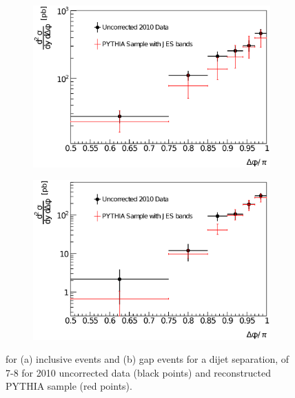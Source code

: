 \begin{figure}
\centering
        \begin{subfigure}[b]{0.5\textwidth}
                \centering
                \includegraphics[width=\textwidth]{figures/GBJ2/ControlPlots/Smeared__dPhi__7_8.eps}
        \end{subfigure}%
        \begin{subfigure}[b]{0.5\textwidth}
                \centering
                \includegraphics[width=\textwidth]{figures/GBJ2/ControlPlots/Smeared__dPhi_gap__7_8.eps}
        \end{subfigure}%
\caption[Comparison of the data and PYTHIA for \dphidyDist{} with $7<\dy{}<8$]{
\dphidyDist{} for (a) inclusive events and (b) gap events for a dijet separation, \dy{} of 7-8 for 2010 uncorrected data (black points) and reconstructed PYTHIA sample (red points).
\label{GBJ2:Uncorr:dphi78}}
\end{figure}



